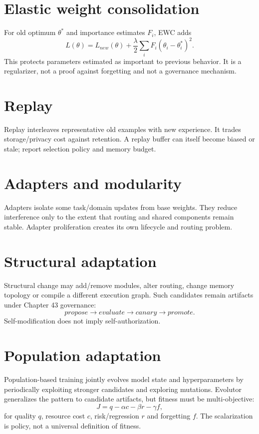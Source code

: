 \section{Elastic weight consolidation}
For old optimum $\theta^*$ and importance estimates $F_i$, EWC adds
\[
L(\theta)=L_{new}(\theta)+\frac{\lambda}{2}\sum_iF_i(\theta_i-\theta_i^*)^2.
\]
This protects parameters estimated as important to previous behavior. It is a regularizer, not a proof against forgetting and not a governance mechanism.

\section{Replay}
Replay interleaves representative old examples with new experience. It trades storage/privacy cost against retention. A replay buffer can itself become biased or stale; report selection policy and memory budget.

\section{Adapters and modularity}
Adapters isolate some task/domain updates from base weights. They reduce interference only to the extent that routing and shared components remain stable. Adapter proliferation creates its own lifecycle and routing problem.

\section{Structural adaptation}
Structural change may add/remove modules, alter routing, change memory topology or compile a different execution graph. Such candidates remain artifacts under Chapter 43 governance:
\[
propose\rightarrow evaluate\rightarrow canary\rightarrow promote.
\]
Self-modification does not imply self-authorization.

\section{Population adaptation}
Population-based training jointly evolves model state and hyperparameters by periodically exploiting stronger candidates and exploring mutations. Evolutor generalizes the pattern to candidate artifacts, but fitness must be multi-objective:
\[
J=q-\alpha c-\beta r-\gamma f,
\]
for quality $q$, resource cost $c$, risk/regression $r$ and forgetting $f$. The scalarization is policy, not a universal definition of fitness.

